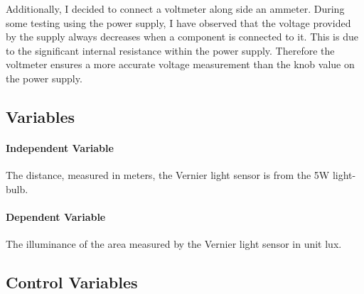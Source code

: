 \documentclass[a4paper,12pt]{article}
\begin{document}

Additionally, I decided to connect a voltmeter along side an ammeter. During some testing using the power supply, I have observed that the voltage provided by the supply always decreases when a component is connected to it. This is due to the significant internal resistance within the power supply. Therefore the voltmeter ensures a more accurate voltage measurement than the knob value on the power supply.


\subsection{Variables}
\paragraph{Independent Variable}
The distance, measured in meters, the Vernier light sensor is from the 5W light-bulb.

\paragraph{Dependent Variable}
The illuminance of the area measured by the Vernier light sensor in unit lux.

\subsection{Control Variables}
\end{document}
